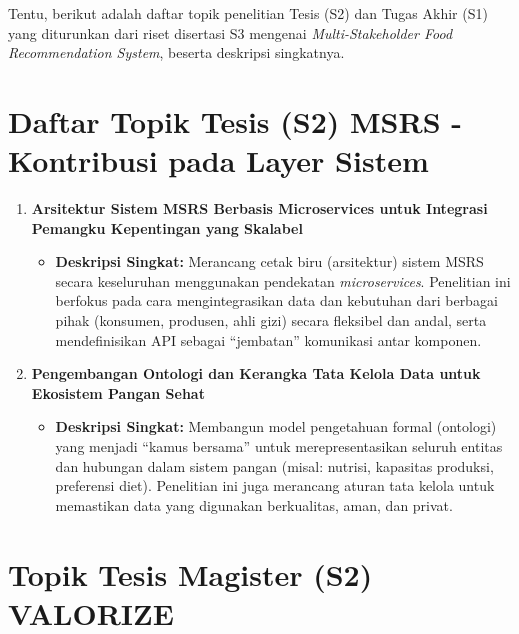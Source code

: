 \documentclass[
  letterpaper,
  DIV=11,
  numbers=noendperiod]{scrreprt}
\providecommand{\tightlist}{%
  \setlength{\itemsep}{0pt}\setlength{\parskip}{0pt}}
\begin{document}
Tentu, berikut adalah daftar topik penelitian Tesis (S2) dan Tugas Akhir
(S1) yang diturunkan dari riset disertasi S3 mengenai
\emph{Multi-Stakeholder Food Recommendation System}, beserta deskripsi
singkatnya.

\section{\texorpdfstring{\textbf{Daftar Topik Tesis (S2) MSRS -
Kontribusi pada Layer
Sistem}}{Daftar Topik Tesis (S2) MSRS - Kontribusi pada Layer Sistem}}\label{daftar-topik-tesis-s2-msrs---kontribusi-pada-layer-sistem}

\begin{enumerate}
\def\labelenumi{\arabic{enumi}.}
\tightlist
\item
  \textbf{Arsitektur Sistem MSRS Berbasis Microservices untuk Integrasi
  Pemangku Kepentingan yang Skalabel}

  \begin{itemize}
  \tightlist
  \item
    \textbf{Deskripsi Singkat:} Merancang cetak biru (arsitektur) sistem
    MSRS secara keseluruhan menggunakan pendekatan \emph{microservices}.
    Penelitian ini berfokus pada cara mengintegrasikan data dan
    kebutuhan dari berbagai pihak (konsumen, produsen, ahli gizi) secara
    fleksibel dan andal, serta mendefinisikan API sebagai ``jembatan''
    komunikasi antar komponen.
  \end{itemize}
\item
  \textbf{Pengembangan Ontologi dan Kerangka Tata Kelola Data untuk
  Ekosistem Pangan Sehat}

  \begin{itemize}
  \tightlist
  \item
    \textbf{Deskripsi Singkat:} Membangun model pengetahuan formal
    (ontologi) yang menjadi ``kamus bersama'' untuk merepresentasikan
    seluruh entitas dan hubungan dalam sistem pangan (misal: nutrisi,
    kapasitas produksi, preferensi diet). Penelitian ini juga merancang
    aturan tata kelola untuk memastikan data yang digunakan berkualitas,
    aman, dan privat.
  \end{itemize}
\end{enumerate}

\section{Topik Tesis Magister (S2)
VALORIZE}\label{topik-tesis-magister-s2-valorize}
\end{document}

